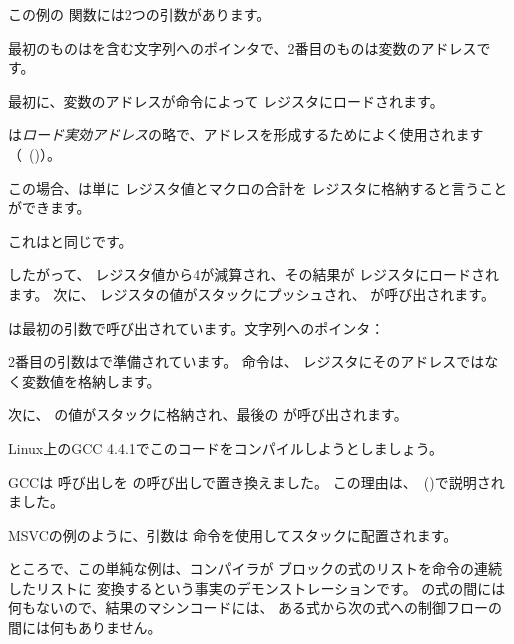 この例の \scanf 関数には2つの引数があります。

最初のものはを含む文字列へのポインタで、2番目のものは変数のアドレスです。

最初に、変数のアドレスが命令によって \EAX レジスタにロードされます。

\LEA は\emph{ロード実効アドレス}の略で、アドレスを形成するためによく使用されます（~()）。

この場合、\LEA は単に \EBP レジスタ値とマクロの合計を \EAX レジスタに格納すると言うことができます。

これはと同じです。

したがって、 \EBP レジスタ値から4が減算され、その結果が \EAX レジスタにロードされます。
次に、 \EAX レジスタの値がスタックにプッシュされ、 \scanf が呼び出されます。

\printf は最初の引数で呼び出されています。文字列へのポインタ：

2番目の引数はで準備されています。
命令は、 \ECX レジスタにそのアドレスではなく変数値を格納します。

次に、 \ECX の値がスタックに格納され、最後の \printf が呼び出されます。




Linux上のGCC 4.4.1でこのコードをコンパイルしようとしましょう。



GCCは \printf 呼び出しを \puts の呼び出しで置き換えました。 この理由は、~()で説明されました。

% 

MSVCの例のように、引数は \MOV 命令を使用してスタックに配置されます。


ところで、この単純な例は、コンパイラが \CCpp ブロックの式のリストを命令の連続したリストに
変換するという事実のデモンストレーションです。
\CCpp の式の間には何もないので、結果のマシンコードには、
ある式から次の式への制御フローの間には何もありません。
